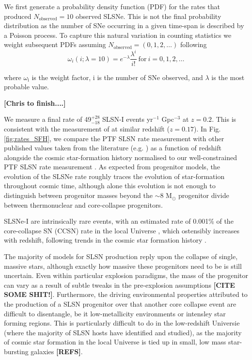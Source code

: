 \documentclass[a4paper,fleqn,usenatbib]{mnras}
\newcommand{\angus}[1]{\color{JungleGreen}#1\color{black}}
\newcommand{\chris}[1]{\color{orange}#1\color{black}}
\newcommand{\comment}[1]{\textbf{[#1]}}
\begin{document}
We first generate a probability density function (PDF) for the rates that produced $N_\mathrm{observed}=10$ observed SLSNe. This is not the final probability distribution as the number of SNe occurring in a given time-span is described by a Poisson process. To capture this natural variation in counting statistics we weight subsequent PDFs assuming $N_\mathrm{observed}=(0, 1, 2, \dots)$ following 
\begin{equation}
    \omega_i(i; \lambda=10)=e^{-\lambda }{\frac {\lambda ^{i}}{i!}} \mathrm{~for~} i=0, 1, 2, \dots
\end{equation}

where $\omega_\mathrm{i}$ is the weight factor, i is the number of SNe observed, and $\lambda$ is the most probable value. 

\comment{\chris{Chris to finish....}}


We measure a final rate of 49$^{+28}_{-18}$ SLSN-I events yr$^{-1}$ Gpc$^{-3}$ at $z=0.2$. This is consistent with the measurement of \citep{Quimby2013} at similar redshift ($z=0.17$). In Fig. \ref{fig:rates_SFH}, we compare the PTF SLSN rate measurement with other published values taken from the literature (e.g. \citep{Quimby2013,McCrum2015,Prajs2016,Cooke2012}) as a function of redshift alongside the cosmic star-formation history normalised to our well-constrained PTF SLSN rate measurement \citep[SFH; see][]{Hopkins2006}. As expected from progenitor models, the evolution of the SLSNe rate roughly traces the evolution of star-formation throughout cosmic time, although alone this evolution is not enough to distinguish between progenitor masses beyond the $\sim$8 M$_{\odot}$ progenitor divide between thermonuclear and core-collapse progenitors.


SLSNe-I are intrinsically rare events, with an estimated rate of 0.001\% of the core-collapse SN (CCSN) rate in the local Universe \citep{Quimby2011,Quimby2013,McCrum2015}, which ostensibly increases with redshift, following trends in the cosmic star formation history \citep{Prajs2016,Cooke2012,Moriya2018}. 


The majority of models for SLSN production reply upon the collapse of single, massive stars, although exactly how massive these progenitors need to be is still uncertain. Even within particular explosion paradigms, the mass of the progenitor can vary as a result of subtle tweaks in the pre-explosion assumptions \comment{\angus{CITE SOME SHIT!}}. Furthermore, the driving environmental properties attributed to the production of a SLSN progenitor over that another core collapse event are difficult to disentangle, be it low-metallicity environments or intensley star forming regions. This is particularly difficult to do in the low-redshift Universie (where the majority of SLSN hosts have identified and studied), as the majority of cosmic star formation in the local Universe is tied up in small, low mass star-bursting galaxies \comment{\angus{REFS}}. 
\end{document}
